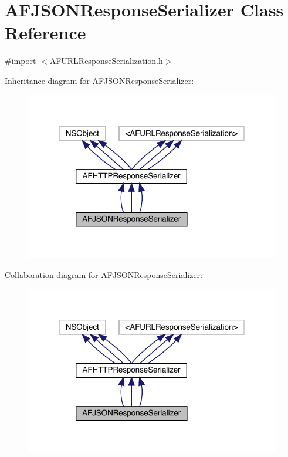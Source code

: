 \hypertarget{interface_a_f_j_s_o_n_response_serializer}{}\section{A\+F\+J\+S\+O\+N\+Response\+Serializer Class Reference}
\label{interface_a_f_j_s_o_n_response_serializer}


{\ttfamily \#import $<$A\+F\+U\+R\+L\+Response\+Serialization.\+h$>$}



Inheritance diagram for A\+F\+J\+S\+O\+N\+Response\+Serializer\+:\nopagebreak
\begin{figure}[H]
\begin{center}
\leavevmode
\includegraphics[width=316pt]{interface_a_f_j_s_o_n_response_serializer__inherit__graph}
\end{center}
\end{figure}


Collaboration diagram for A\+F\+J\+S\+O\+N\+Response\+Serializer\+:\nopagebreak
\begin{figure}[H]
\begin{center}
\leavevmode
\includegraphics[width=316pt]{interface_a_f_j_s_o_n_response_serializer__coll__graph}
\end{center}
\end{figure}
